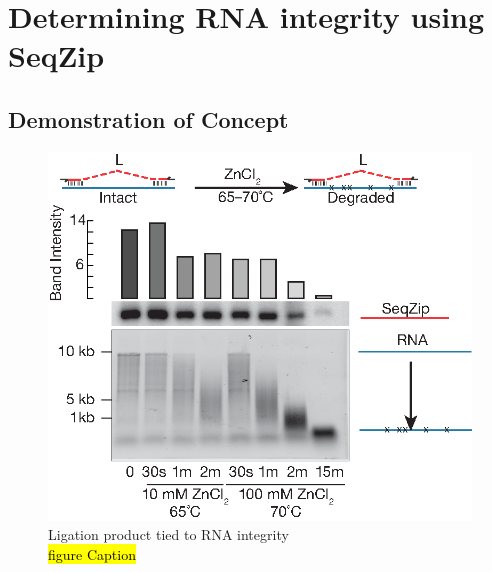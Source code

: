 \section{Determining RNA integrity using SeqZip}\label{sec: SeqZip Integrity}

  \subsection{Demonstration of Concept}

	  \begin{figure}[htbp] %
    	\centering 
    	\includegraphics{Figures/Chapter2/DegreadedRNABySeqZip.eps}
    	\caption[Ligation product tied to RNA integrity]
    	{
		    Ligation product tied to RNA integrity\\
      	\hl{figure Caption}
    		}
    	\label{fig:Ligation product and RNA integrity}
  		\end{figure}

